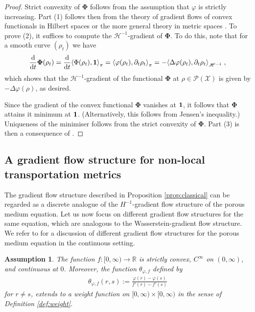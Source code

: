 \documentclass[a4paper,11pt,reqno]{amsart}
\theoremstyle{plain}
\newtheorem{assumption}[theorem]{Assumption}
\theoremstyle{remark}
\numberwithin{equation}{section}
\begin{document}
\begin{proof}
  Strict convexity of ${\boldsymbol{\Phi}}$ follows from the assumption that ${\varphi}$
  is strictly increasing. Part (1) follows then from the theory of
  gradient flows of convex functionals in Hilbert spaces
  \cite[Th\'eor\`eme 3.1]{Bre73} or the more general theory in metric
  spaces \cite[Theorem 4.0.4]{AGS08}.  To prove (2), it suffices to
  compute the ${\mathscr{H}}^{-1}$-gradient of ${\boldsymbol{\Phi}}$. To do this, note that
  for a smooth curve $(\rho_t)$ we have
\begin{align*}
 {\frac{\mathrm{d}}{\mathrm{d}t}} {\boldsymbol{\Phi}}(\rho_t) 
   =  {\frac{\mathrm{d}}{\mathrm{d}t}} {\langle {{\Phi(\rho_t), {{{\bf 1}}}}}\rangle}_\pi
   =   {\langle {{{\varphi}(\rho_t), \partial_t\rho_t}}\rangle}_\pi
   =   -{\langle {{\Delta{\varphi}(\rho_t), \partial_t\rho_t}}\rangle}_{{\mathscr{H}}^{-1}}\;,
\end{align*}
which shows that the ${\mathscr{H}}^{-1}$-gradient of the functional ${\boldsymbol{\Phi}}$ at
$\rho \in{{\mathscr{P}}({\mathcal{X}})}$ is given by $-\Delta{\varphi}(\rho)$, as desired.

Since the gradient of the convex functional ${\boldsymbol{\Phi}}$ vanishes at
${{{\bf 1}}}$, it follows that ${\boldsymbol{\Phi}}$ attains it minimum at
${{{\bf 1}}}$. (Alternatively, this follows from Jensen's inequality.)
Uniqueness of the minimiser follows from the strict convexity of
${\boldsymbol{\Phi}}$. Part (3) is then a consequence of \cite[Corollary
4.0.6]{AGS08}.
\end{proof}

\subsection{A gradient flow structure for non-local transportation metrics}

The gradient flow structure described in Proposition
\ref{prop:classical} can be regarded as a discrete analogue of the
$H^{-1}$-gradient flow structure of the porous medium equation.  Let
us now focus on different gradient flow structures for the same
equation, which are analogous to the Wasserstein-gradient flow
structure. We refer to \cite[Section 2]{O01} for a discussion of
different gradient flow structures for the porous medium equation in
the continuous setting.

\begin{assumption}\label{ass:f}
The function $f : [0,\infty) \to {{\mathbb R}}$ is strictly convex,
  $C^\infty$ on $(0,\infty)$, and continuous at $0$.
Moreover, the function $\theta_{{\varphi},f}$ defined by
\begin{align*}
 \theta_{{\varphi},f}(r,s) := \frac{{\varphi}(r) - {\varphi}(s)}{f'(r) - f'(s)}
\end{align*}
for $r \neq s$, extends to a weight function on $[0,\infty) \times [0,\infty)$ in the sense of Definition \ref{def:weight}.
\end{assumption}
\end{document}
